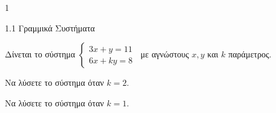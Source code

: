 \begin{ylh}{1}
\item 1.1 Γραμμικά Συστήματα
\end{ylh}
Δίνεται το σύστημα \(\left\{ \begin{array}{r}
3x + y = 11 \\
6x + ky = 8
\end{array} \right.\ \) με αγνώστους $x,y$ και $k$ παράμετρος.
\begin{alist}
\item Να λύσετε το σύστημα όταν $k = 2$.
\item Να λύσετε το σύστημα όταν $k = 1$.
\end{alist}

